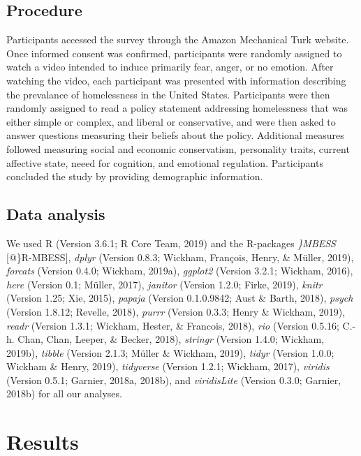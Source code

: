 \documentclass[man]{apa6}
\begin{document}
\subsection{Procedure}\label{procedure}

Participants accessed the survey through the Amazon Mechanical Turk
website. Once informed consent was confirmed, participants were randomly
assigned to watch a video intended to induce primarily fear, anger, or
no emotion. After watching the video, each participant was presented
with information describing the prevalance of homelessness in the United
States. Participants were then randomly assigned to read a policy
statement addressing homelessness that was either simple or complex, and
liberal or conservative, and were then asked to answer questions
measuring their beliefs about the policy. Additional measures followed
measuring social and economic conservatism, personality traits, current
affective state, neeed for cognition, and emotional regulation.
Participants concluded the study by providing demographic information.

\subsection{Data analysis}\label{data-analysis}

We used R (Version 3.6.1; R Core Team, 2019) and the R-packages
\emph{\}MBESS} {[}@\}R-MBESS{]}, \emph{dplyr} (Version 0.8.3; Wickham,
François, Henry, \& Müller, 2019), \emph{forcats} (Version 0.4.0;
Wickham, 2019a), \emph{ggplot2} (Version 3.2.1; Wickham, 2016),
\emph{here} (Version 0.1; Müller, 2017), \emph{janitor} (Version 1.2.0;
Firke, 2019), \emph{knitr} (Version 1.25; Xie, 2015), \emph{papaja}
(Version 0.1.0.9842; Aust \& Barth, 2018), \emph{psych} (Version 1.8.12;
Revelle, 2018), \emph{purrr} (Version 0.3.3; Henry \& Wickham, 2019),
\emph{readr} (Version 1.3.1; Wickham, Hester, \& Francois, 2018),
\emph{rio} (Version 0.5.16; C.-h. Chan, Chan, Leeper, \& Becker, 2018),
\emph{stringr} (Version 1.4.0; Wickham, 2019b), \emph{tibble} (Version
2.1.3; Müller \& Wickham, 2019), \emph{tidyr} (Version 1.0.0; Wickham \&
Henry, 2019), \emph{tidyverse} (Version 1.2.1; Wickham, 2017),
\emph{viridis} (Version 0.5.1; Garnier, 2018a, 2018b), and
\emph{viridisLite} (Version 0.3.0; Garnier, 2018b) for all our analyses.

\section{Results}\label{results}
\end{document}
